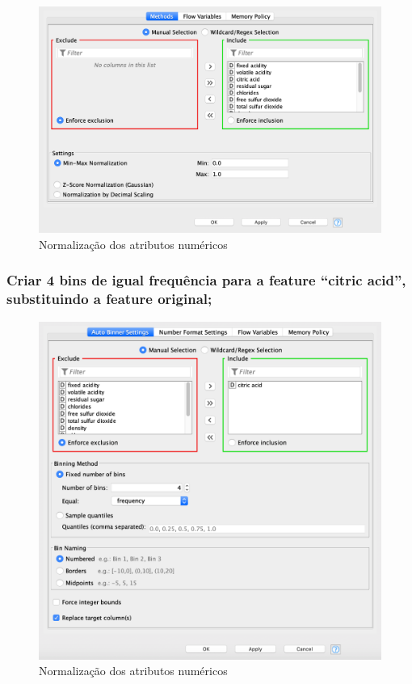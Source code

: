 \documentclass{article}
\begin{document}
\begin{figure}[H]
    \centering
    \includegraphics[scale=0.3]{Images/T2_b.png}
    \caption{Normalização dos atributos numéricos}
\end{figure}

\subsubsection{Criar 4 bins de igual frequência para a feature “citric acid”, substituindo a feature original;}

\begin{figure}[H]
    \centering
    \includegraphics[scale=0.3]{Images/T2_c.png}
    \caption{Normalização dos atributos numéricos}
\end{figure}
\end{document}
